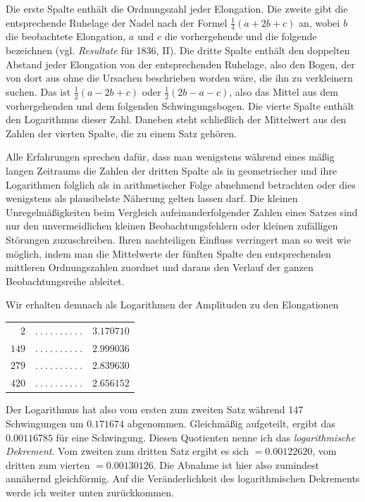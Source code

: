 Die erste Spalte enthält die Ordnungszahl jeder Elongation. Die zweite gibt die entsprechende Ruhelage der Nadel nach der Formel $\tfrac14(a+2b+c)$ an, wobei $b$ die beobachtete Elongation, $a$ und $c$ die vorhergehende und die folgende bezeichnen (vgl. \textit{Resultate} für 1836, II). Die dritte Spalte enthält den doppelten Abstand jeder Elongation von der entsprechenden Ruhelage, also den Bogen, der von dort aus ohne die Ursachen beschrieben worden wäre, die ihn zu verkleinern suchen. Das ist $\tfrac12(a-2b+c)$ oder $\tfrac12(2b-a-c)$, also das Mittel aus dem vorhergehenden und dem folgenden Schwingungsbogen. Die vierte Spalte enthält den Logarithmus dieser Zahl. Daneben steht schließlich der Mittelwert aus den Zahlen der vierten Spalte, die zu einem Satz gehören.

Alle Erfahrungen sprechen dafür, dass man wenigstens während eines mäßig langen Zeitraums die Zahlen der dritten Spalte als in geometrischer
und ihre Logarithmen folglich als in arithmetischer Folge abnehmend betrachten oder dies wenigstens als plausibelste Näherung gelten lassen darf. Die kleinen Unregelmäßigkeiten beim Vergleich aufeinanderfolgender Zahlen eines Satzes sind nur den unvermeidlichen kleinen Beobachtungsfehlern oder kleinen zufälligen Störungen zuzuschreiben. Ihren nachteiligen Einfluss verringert man so weit wie möglich, indem man die Mittelwerte der fünften Spalte den entsprechenden mittleren Ordnungszahlen zuordnet und daraus den Verlauf der ganzen Beobachtungsreihe ableitet.

Wir erhalten demnach als Logarithmen der Amplituden zu den Elongationen
\begin{center}
\begin{tabular}{rcl}
$2$ & $.\ .\ .\ .\ .\ .\ .\ .\ .\ .$ & $3.170710$\\
$149$ & $.\ .\ .\ .\ .\ .\ .\ .\ .\ .$ & $2.999036$\\
$279$ & $.\ .\ .\ .\ .\ .\ .\ .\ .\ .$ & $2.839630$\\
$420$ & $.\ .\ .\ .\ .\ .\ .\ .\ .\ .$ & $2.656152$
\end{tabular}
\end{center}

Der Logarithmus hat also vom ersten zum zweiten Satz während 147 Schwingungen um $0.171674$ abgenommen. Gleichmäßig aufgeteilt, ergibt das $0.00116785$ für eine Schwingung. Diesen Quotienten nenne ich das \textit{logarithmische Dekrement}. Vom zweiten zum dritten Satz ergibt es sich $=0.00122620$, vom dritten zum vierten $=0.00130126$. Die Abnahme ist hier also zumindest annähernd gleichförmig. Auf die Veränderlichkeit des logarithmischen Dekrements werde ich weiter unten zurückkommen.

